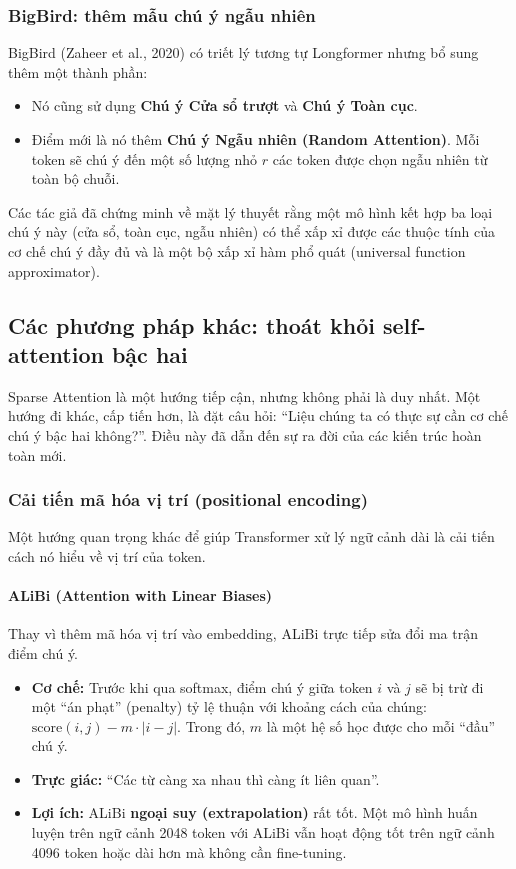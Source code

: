 \subsubsection{BigBird: thêm mẫu chú ý ngẫu nhiên}
BigBird (Zaheer et al., 2020) \cite{zaheer2020big} có triết lý tương tự Longformer nhưng bổ sung thêm một thành phần:
\begin{itemize}
    \item Nó cũng sử dụng \textbf{Chú ý Cửa sổ trượt} và \textbf{Chú ý Toàn cục}.
    \item Điểm mới là nó thêm \textbf{Chú ý Ngẫu nhiên (Random Attention)}. Mỗi token sẽ chú ý đến một số lượng nhỏ $r$ các token được chọn ngẫu nhiên từ toàn bộ chuỗi.
\end{itemize}
Các tác giả đã chứng minh về mặt lý thuyết rằng một mô hình kết hợp ba loại chú ý này (cửa sổ, toàn cục, ngẫu nhiên) có thể xấp xỉ được các thuộc tính của cơ chế chú ý đầy đủ và là một bộ xấp xỉ hàm phổ quát (universal function approximator).

\subsection{Các phương pháp khác: thoát khỏi self-attention bậc hai}
\label{ssec:other_long_context_methods}

Sparse Attention là một hướng tiếp cận, nhưng không phải là duy nhất. Một hướng đi khác, cấp tiến hơn, là đặt câu hỏi: “Liệu chúng ta có thực sự cần cơ chế chú ý bậc hai không?”. Điều này đã dẫn đến sự ra đời của các kiến trúc hoàn toàn mới.
\subsubsection{Cải tiến mã hóa vị trí (positional encoding)}
\label{sssec:pe_long_context}
Một hướng quan trọng khác để giúp Transformer xử lý ngữ cảnh dài là cải tiến cách nó hiểu về vị trí của token.
\paragraph{ALiBi (Attention with Linear Biases)}
Thay vì thêm mã hóa vị trí vào embedding, ALiBi \cite{press2021train} trực tiếp sửa đổi ma trận điểm chú ý.
\begin{itemize}
    \item \textbf{Cơ chế:} Trước khi qua softmax, điểm chú ý giữa token $i$ và $j$ sẽ bị trừ đi một “án phạt” (penalty) tỷ lệ thuận với khoảng cách của chúng: $\text{score}(i, j) - m \cdot |i - j|$. Trong đó, $m$ là một hệ số học được cho mỗi “đầu” chú ý.
    \item \textbf{Trực giác:} “Các từ càng xa nhau thì càng ít liên quan”.
    \item \textbf{Lợi ích:} ALiBi \textbf{ngoại suy (extrapolation)} rất tốt. Một mô hình huấn luyện trên ngữ cảnh 2048 token với ALiBi vẫn hoạt động tốt trên ngữ cảnh 4096 token hoặc dài hơn mà không cần fine-tuning.
\end{itemize}

